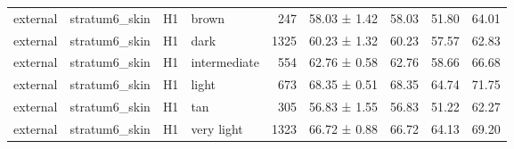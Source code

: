 \begin{tabular}{llllrlrrr}
external & stratum6\_skin & H1 & brown & 247 & 58.03 ± 1.42 & 58.03 & 51.80 & 64.01 \\
external & stratum6\_skin & H1 & dark & 1325 & 60.23 ± 1.32 & 60.23 & 57.57 & 62.83 \\
external & stratum6\_skin & H1 & intermediate & 554 & 62.76 ± 0.58 & 62.76 & 58.66 & 66.68 \\
external & stratum6\_skin & H1 & light & 673 & 68.35 ± 0.51 & 68.35 & 64.74 & 71.75 \\
external & stratum6\_skin & H1 & tan & 305 & 56.83 ± 1.55 & 56.83 & 51.22 & 62.27 \\
external & stratum6\_skin & H1 & very light & 1323 & 66.72 ± 0.88 & 66.72 & 64.13 & 69.20 \\
\bottomrule
\end{tabular}

